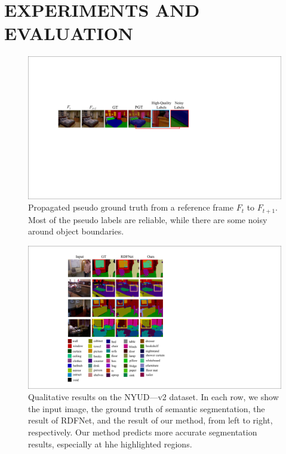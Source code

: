 \section{EXPERIMENTS AND EVALUATION}
\label{sec:exper}

\begin{figure}[t]
	\centering
	\includegraphics[width=\columnwidth]{figure/PGT.pdf}
	\caption{Propagated pseudo ground truth from a reference frame $F_t$ to $F_{t+1}$. Most of the pseudo labels are reliable, while there are some noisy around object boundaries.}
	\label{fig:PGT}
\end{figure}

\begin{figure}[!th]
	\centering
	\includegraphics[width=\columnwidth]{figure/Result.pdf}
	\caption{Qualitative results on the NYUD—v2 dataset. In each row, we show the input image, the ground truth of semantic segmentation, the result of RDFNet, and the result of our method, from left to right, respectively. Our method predicts more accurate segmentation results, especially at hhe highlighted regions.}
	\label{fig:VisResult}
\end{figure}

